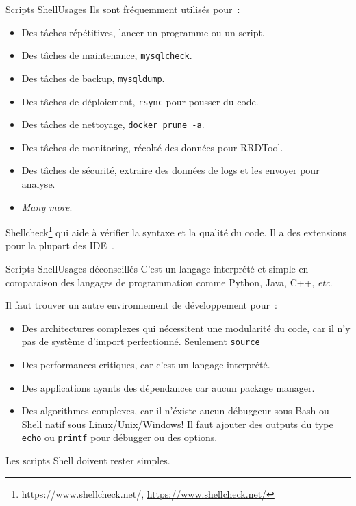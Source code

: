 \documentclass{beamer}
\begin{document}
    \begin{frame}{Scripts Shell}{Usages}
        Ils sont fréquemment utilisés pour~:
        \begin{itemize}
            \item Des tâches répétitives, lancer un programme ou un script.
            \item Des tâches de maintenance, \lstinline{mysqlcheck}.
            \item Des tâches de backup, \lstinline{mysqldump}.
            \item Des tâches de déploiement, \lstinline{rsync} pour pousser du code.
            \item Des tâches de nettoyage, \lstinline{docker prune -a}.
            \item Des tâches de monitoring, récolté des données pour RRDTool.
            \item Des tâches de sécurité, extraire des données de logs et les envoyer pour analyse.
            \item \textit{Many more}.
        \end{itemize}
        Shellcheck\footnote{https://www.shellcheck.net/, \url{https://www.shellcheck.net/}} qui aide à vérifier la syntaxe et la qualité du code.
        Il a des extensions pour la plupart des IDE~.
    \end{frame}

    \begin{frame}{Scripts Shell}{Usages déconseillés}
        C'est un langage interprété et simple en comparaison des langages de programmation comme Python, Java, C++, \textit{etc}.

        Il faut trouver un autre environnement de développement pour~:
        \begin{itemize}
            \item Des architectures complexes qui nécessitent une modularité du code, car il n'y pas de système d'import perfectionné.
            Seulement \lstinline{source}
            \item Des performances critiques, car c'est un langage interprété.
            \item Des applications ayants des dépendances car aucun package manager.
            \item Des algorithmes complexes, car il n'éxiste aucun débuggeur sous Bash ou Shell natif sous Linux/Unix/Windows!
            Il faut ajouter des outputs du type \lstinline{echo} ou \lstinline{printf} pour débugger ou des options.
        \end{itemize}
        \bigbreak
        Les scripts Shell doivent rester simples.
    \end{frame}
\end{document}
